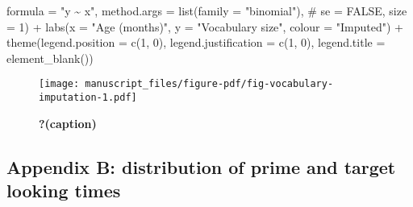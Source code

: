 \documentclass[
  letterpaper,
  DIV=11,
  numbers=noendperiod]{scrartcl}
\newenvironment{Shaded}{\begin{snugshade}}{\end{snugshade}}
\newcommand{\AttributeTok}[1]{\textcolor[rgb]{0.40,0.45,0.13}{#1}}
\newcommand{\CommentTok}[1]{\textcolor[rgb]{0.37,0.37,0.37}{#1}}
\newcommand{\DecValTok}[1]{\textcolor[rgb]{0.68,0.00,0.00}{#1}}
\newcommand{\FunctionTok}[1]{\textcolor[rgb]{0.28,0.35,0.67}{#1}}
\newcommand{\NormalTok}[1]{\textcolor[rgb]{0.00,0.23,0.31}{#1}}
\newcommand{\SpecialCharTok}[1]{\textcolor[rgb]{0.37,0.37,0.37}{#1}}
\newcommand{\StringTok}[1]{\textcolor[rgb]{0.13,0.47,0.30}{#1}}
\begin{document}
\begin{Shaded}
\begin{Highlighting}[]
                \AttributeTok{formula =} \StringTok{"y \textasciitilde{} x"}\NormalTok{,}
                \AttributeTok{method.args =} \FunctionTok{list}\NormalTok{(}\AttributeTok{family =} \StringTok{"binomial"}\NormalTok{), }
                \CommentTok{\# se = FALSE,}
                \AttributeTok{size =} \DecValTok{1}\NormalTok{) }\SpecialCharTok{+}
    \FunctionTok{labs}\NormalTok{(}\AttributeTok{x =} \StringTok{"Age (months)"}\NormalTok{,}
         \AttributeTok{y =} \StringTok{"Vocabulary size"}\NormalTok{,}
         \AttributeTok{colour =} \StringTok{"Imputed"}\NormalTok{) }\SpecialCharTok{+}
    \FunctionTok{theme}\NormalTok{(}\AttributeTok{legend.position =} \FunctionTok{c}\NormalTok{(}\DecValTok{1}\NormalTok{, }\DecValTok{0}\NormalTok{),}
          \AttributeTok{legend.justification =} \FunctionTok{c}\NormalTok{(}\DecValTok{1}\NormalTok{, }\DecValTok{0}\NormalTok{),}
          \AttributeTok{legend.title =} \FunctionTok{element\_blank}\NormalTok{())}
\end{Highlighting}
\end{Shaded}

\begin{figure}[H]

{\centering \texttt{[image: manuscript\_files/figure-pdf/fig-vocabulary-imputation-1.pdf]}

}

\caption{\label{fig-vocabulary-imputation}\textbf{?(caption)}}

\end{figure}

\hypertarget{appendix-b-distribution-of-prime-and-target-looking-times}{%
\subsection{Appendix B: distribution of prime and target looking
times}\label{appendix-b-distribution-of-prime-and-target-looking-times}}
\end{document}
